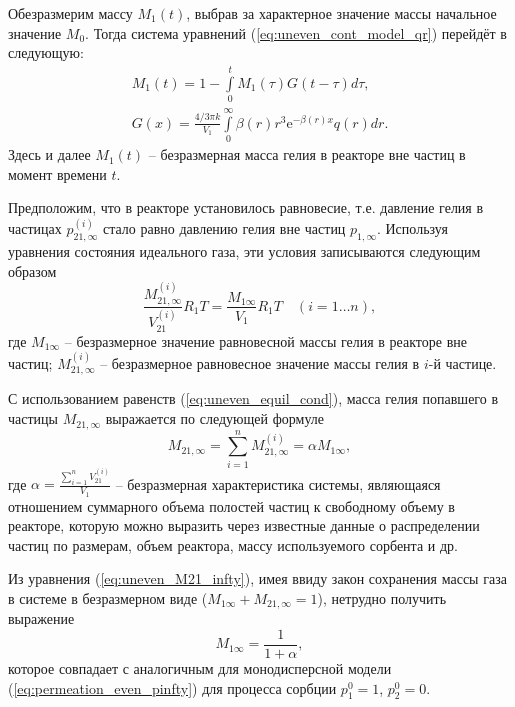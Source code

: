 Обезразмерим массу $M_1(t)$, выбрав за характерное значение массы начальное значение $M_0$.  Тогда система уравнений  (\ref{eq:uneven_cont_model_qr}) перейдёт в следующую:
\begin{equation}
\label{eq:uneven_cont_model_qr_dimensionless}
\begin{array}{c}
M_1(t)=1-\int\limits_{0}^{t}  M_1(\tau)  G(t-\tau) d\tau, \\
G(x) = \displaystyle\frac{4/3 \pi k}{V_1} \int\limits_{0}^{\infty}\beta(r) r^3  \mathrm{e}^{-\beta(r) x} q(r) dr.
\end{array}
\end{equation}
Здесь и далее $M_1(t)$ -- безразмерная масса гелия в реакторе вне частиц в момент времени $t$.

Предположим, что в реакторе установилось равновесие, т.е. давление гелия в частицах $p_{21,\infty}^{(i)}$ стало равно давлению гелия вне частиц $p_{1,\infty}$. Используя уравнения состояния идеального газа, эти условия записываются следующим образом
\begin{equation}
\label{eq:uneven_equil_cond}
\frac{M_{21,\infty}^{(i)}}{V_{21}^{(i)}} R_1 T = \frac{M_{1\infty}}{V_1}R_1 T \quad (i=1 \ldots n),
\end{equation}
где $M_{1\infty}$ -- безразмерное значение равновесной массы гелия в реакторе вне частиц; $M_{21,\infty}^{(i)}$ -- безразмерное равновесное значение массы гелия в $i$-й частице.

С использованием равенств (\ref{eq:uneven_equil_cond}), масса гелия попавшего в частицы $M_{21,\infty}$ выражается по следующей формуле
\begin{equation}
\label{eq:uneven_M21_infty}
M_{21,\infty} = \sum\limits_{i=1}^{n}M_{21,\infty}^{(i)}=\alpha M_{1\infty}, 
\end{equation}
где $\alpha = \displaystyle\frac{\sum\limits_{i=1}^{n} V_{21}^{(i)}}{V_1}$ -- безразмерная характеристика системы, являющаяся отношением суммарного объема полостей частиц к свободному объему в реакторе, которую можно выразить через известные данные о распределении частиц по размерам, объем реактора, массу используемого сорбента и др.

Из уравнения (\ref{eq:uneven_M21_infty}), имея ввиду закон сохранения массы газа в системе в безразмерном виде ($M_{1\infty}+M_{21,\infty}=1$), нетрудно получить выражение 
\begin{equation}
\label{eq:uneven_M1_infty}
M_{1\infty} = \frac{1}{1+\alpha},
\end{equation}
которое совпадает с аналогичным для монодисперсной модели (\ref{eq:permeation_even_pinfty}) для процесса сорбции $p_1^0=1$, $p_2^0=0$.

